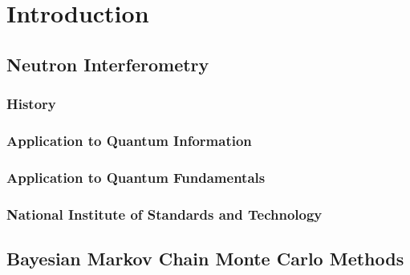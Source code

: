
\chapter{Introduction} %
\label{Chapter1}


\section{Neutron Interferometry}
\subsection{History}
\subsection{Application to Quantum Information}
\subsection{Application to Quantum Fundamentals}
\subsection{National Institute of Standards and Technology}
\section{Bayesian Markov Chain Monte Carlo Methods}


